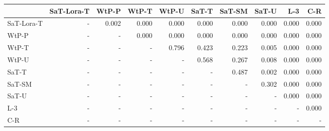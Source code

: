 \begin{tabular}{lrrrrrrrrr}
\toprule
 & SaT-Lora-T & WtP-P & WtP-T & WtP-U & SaT-T & SaT-SM & SaT-U & L-3 & C-R \\
\midrule
SaT-Lora-T & - & 0.002 & 0.000 & 0.000 & 0.000 & 0.000 & 0.000 & 0.000 & 0.000 \\
WtP-P & - & - & 0.000 & 0.000 & 0.000 & 0.000 & 0.000 & 0.000 & 0.000 \\
WtP-T & - & - & - & 0.796 & 0.423 & 0.223 & 0.005 & 0.000 & 0.000 \\
WtP-U & - & - & - & - & 0.568 & 0.267 & 0.008 & 0.000 & 0.000 \\
SaT-T & - & - & - & - & - & 0.487 & 0.002 & 0.000 & 0.000 \\
SaT-SM & - & - & - & - & - & - & 0.302 & 0.000 & 0.000 \\
SaT-U & - & - & - & - & - & - & - & 0.000 & 0.000 \\
L-3 & - & - & - & - & - & - & - & - & 0.000 \\
C-R & - & - & - & - & - & - & - & - & - \\
\bottomrule
\end{tabular}

